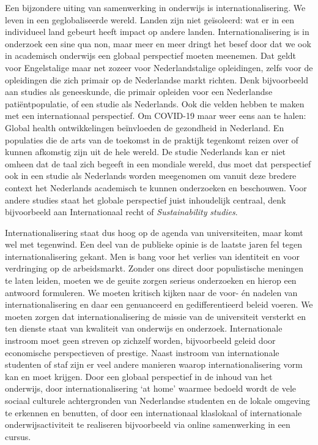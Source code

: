 \documentclass[smallauthor, chapterhaspagenum, nochapterinheader, pagenuminheader,  bigchapnum,medium2, tocpages, garamond, titleinheader]{jote-book}
\begin{document}
	Een bijzondere uiting van samenwerking in onderwijs is internationalisering. We leven in een geglobaliseerde wereld. Landen zijn niet geïsoleerd: wat er in een individueel land gebeurt heeft impact op andere landen. Internationalisering is in onderzoek een sine qua non, maar meer en meer dringt het besef door dat we ook in academisch onderwijs een globaal perspectief moeten meenemen. Dat geldt voor Engelstalige maar net zozeer voor Nederlandstalige opleidingen, zelfs voor de opleidingen die zich primair op de Nederlandse markt richten. Denk bijvoorbeeld aan studies als geneeskunde, die primair opleiden voor een Nederlandse patiëntpopulatie, of een studie als Nederlands. Ook die velden hebben te maken met een internationaal perspectief. Om COVID-19 maar weer eens aan te halen: Global health ontwikkelingen beïnvloeden de gezondheid in Nederland. En populaties die de arts van de toekomst in de praktijk tegenkomt reizen over of kunnen afkomstig zijn uit de hele wereld. De studie Nederlands kan er niet omheen dat de taal zich begeeft in een mondiale wereld, dus moet dat perspectief ook in een studie als Nederlands worden meegenomen om vanuit deze bredere context het Nederlands academisch te kunnen onderzoeken en beschouwen. Voor andere studies staat het globale perspectief juist inhoudelijk centraal, denk bijvoorbeeld aan Internationaal recht of \emph{Sustainability} \emph{studies}.



	Internationalisering staat dus hoog op de agenda van universiteiten, maar komt wel met tegenwind. Een deel van de publieke opinie is de laatste jaren fel tegen internationalisering gekant. Men is bang voor het verlies van identiteit en voor verdringing op de arbeidsmarkt. Zonder ons direct door populistische meningen te laten leiden, moeten we de geuite zorgen serieus onderzoeken en hierop een antwoord formuleren. We moeten kritisch kijken naar de voor- én nadelen van internationalisering en daar een genuanceerd en gedifferentieerd beleid voeren. We moeten zorgen dat internationalisering de missie van de universiteit versterkt en ten dienste staat van kwaliteit van onderwijs en onderzoek. Internationale instroom moet geen streven op zichzelf worden, bijvoorbeeld geleid door economische perspectieven of prestige. Naast instroom van internationale studenten of staf zijn er veel andere manieren waarop internationalisering vorm kan en moet krijgen. Door een globaal perspectief in de inhoud van het onderwijs, door internationalisering ‘at home' waarmee bedoeld wordt de vele sociaal culturele achtergronden van Nederlandse studenten en de lokale omgeving te erkennen en benutten, of door een internationaal klaslokaal of internationale onderwijsactiviteit te realiseren bijvoorbeeld via online samenwerking in een cursus.
\end{document}

